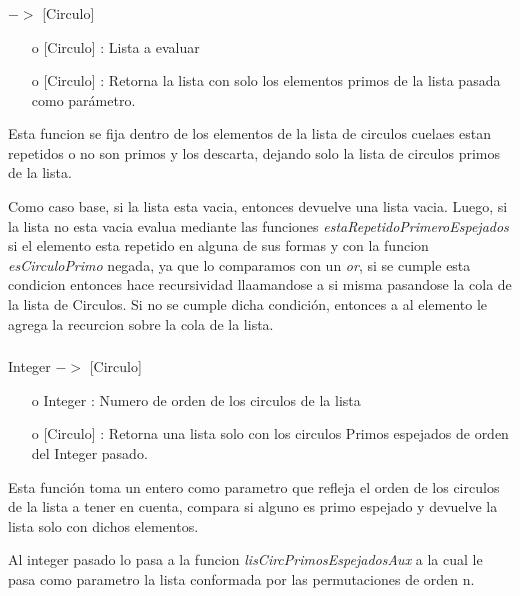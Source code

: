 \documentclass[10pt,journal]{IEEEtran}
\begin{document}
\subsubsection{\color{Red}{lisCircPrimosEspejadosAux}}
\begin{description}[style=nextline]
        \item[\color{Green}{Signatura}] [Circulo] $->$ [Circulo]
        \begin{itemize} 
        \item [o]  [Circulo] : Lista a evaluar
        \item [o]  [Circulo] : Retorna la lista con solo los elementos primos de la lista pasada como parámetro.
        \end{itemize}        
        
        \item[\color{Green}{Descripción}]   Esta funcion se fija dentro de los elementos de la lista de circulos
 cuelaes estan repetidos o no son primos y los descarta, 
 dejando solo la lista de circulos primos de la lista.
 
 Como caso base, si la lista esta vacia, entonces devuelve una lista vacia. Luego, si la lista no esta vacia evalua mediante las funciones \textit{estaRepetidoPrimeroEspejados} si el elemento esta repetido en alguna de sus formas y con la funcion \textit{esCirculoPrimo} negada, ya que lo comparamos con un \textit{or}, si se cumple esta condicion entonces hace recursividad llaamandose a si misma pasandose la cola de la lista de Circulos. Si no se cumple dicha condición, entonces a al elemento le agrega la recurcion sobre la cola de la lista.  
\end{description}

\subsubsection{\color{Red}{listaCirculosPrimosEspejados}}
\begin{description}[style=nextline]
        \item[\color{Green}{Signatura}] Integer $->$ [Circulo]
        \begin{itemize} 
        \item [o]  Integer : Numero de orden de los circulos de la lista
        \item [o] [Circulo] : Retorna una lista solo con los circulos Primos espejados de orden del Integer pasado.
        \end{itemize}        
        
        \item[\color{Green}{Descripción}]   Esta función toma un entero como parametro que refleja el orden de los circulos de la lista a tener en cuenta, compara si alguno es primo espejado y devuelve la lista solo con dichos elementos.
        
        Al integer pasado lo pasa a la funcion \textit{lisCircPrimosEspejadosAux} a la cual le pasa como parametro la lista conformada por las permutaciones de orden n.
\end{description}
\end{document}
